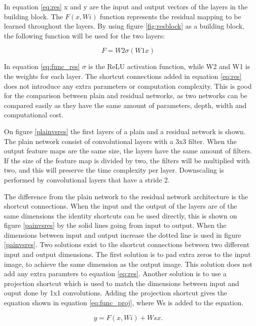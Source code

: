 In equation \ref{eq:res} x and y are the input and output vectors of the layers in the building block. The $F(x,{Wi})$ function represents the residual mapping to be learned throughout the layers. By using figure \ref{fig:resblock} as a building block, the following function will be used for the two layers: 

\begin{equation} \label{eq:func_res}
F = W2\sigma(W1x)
\end{equation} 

In equation \ref{eq:func_res} $\sigma$ is the ReLU activation function, while W2 and W1 is the weights for each layer. The shortcut connections added in equation \ref{eq:res} does not introduce any extra parameters or computation complexity. This is good for the comparison between plain and residual networks, as two networks can be compared easily as they have the same amount of parameters, depth, width and computational cost.
\newline

On figure \ref{plainvsres} the first layers of a plain and a residual network is shown. The plain network consist of convolutional layers with a 3x3 filter. When the output feature maps are the same size, the layers have the same amount of filters. If the size of the feature map is divided by two, the filters will be multiplied with two, and this will preserve the time complexity per layer. Downscaling is performed by convolutional layers that have a stride 2.

\FloatBarrier

The difference from the plain network to the residual network architecture is the shortcut connections. When the input and the output of the layers are of the same dimensions the identity shortcuts can be used directly, this is shown on figure \ref{painvsres} by the solid lines going from input to output. When the dimensions between input and output increase the dotted line is used in figure \ref{painvsres}. Two solutions exist to the shortcut connections between two different input and output dimensions. The first solution is to pad extra zeros to the input image, to achieve the same dimension as the output image. This solution does not add any extra paramters to equation \ref{eq:res}. Another solution is to use a projection shortcut which is used to match the dimensions between input and ouput done by 1x1 convolutions. Adding the projection shortcut gives the equation shown in equation \ref{eq:func_proj}, where Ws is added to the equation.

\begin{equation} \label{eq:func_proj}
y = F(x, {Wi}) + Wsx.
\end{equation} 